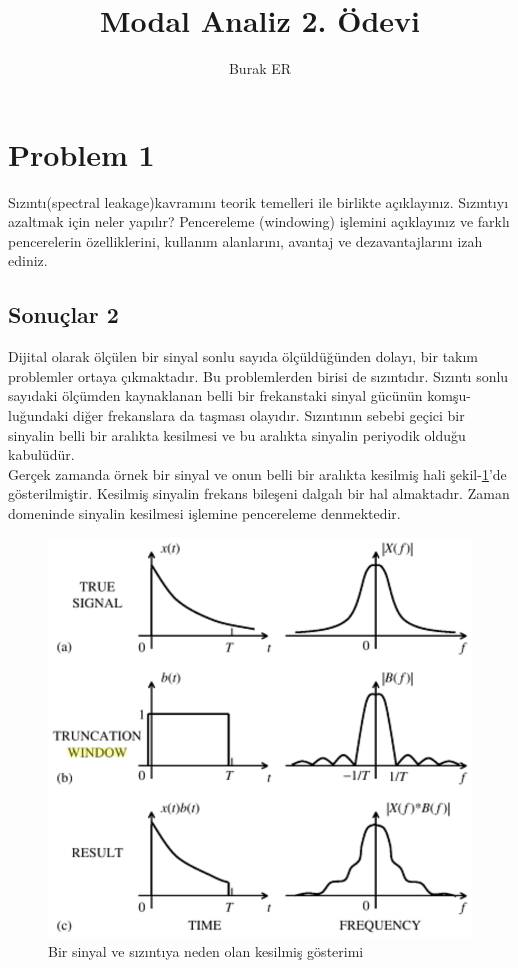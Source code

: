 \documentclass[turkish]{report}
\title{Modal Analiz 2. Ödevi}
\author{Burak ER}
\begin{document}
\maketitle
\section*{Problem 1}
Sızıntı(spectral  leakage)kavramını teorik temelleri ile birlikte  açıklayınız. Sızıntıyı azaltmak için neler yapılır? Pencereleme  (windowing) işlemini açıklayınız ve farklı pencerelerin özelliklerini, kullanım alanlarını, avantaj ve dezavantajlarını izah ediniz. 
\begin{center}
\subsection*{Sonuçlar 2}
\end{center}
Dijital olarak ölçülen bir sinyal sonlu sayıda ölçüldüğünden dolayı, bir takım problemler ortaya çıkmaktadır.
Bu problemlerden birisi de sızıntıdır. Sızıntı sonlu sayıdaki ölçümden kaynaklanan belli bir frekanstaki sinyal gücünün komşu-
luğundaki diğer frekanslara da taşması olayıdır. Sızıntının sebebi geçici bir sinyalin belli bir aralıkta kesilmesi ve bu aralıkta sinyalin periyodik olduğu kabulüdür.\\

Gerçek zamanda örnek bir sinyal ve onun belli bir aralıkta kesilmiş hali şekil-\ref{fig:leakage}'de gösterilmiştir. Kesilmiş sinyalin frekans bileşeni dalgalı bir hal almaktadır.
Zaman domeninde sinyalin kesilmesi işlemine pencereleme denmektedir.
\begin{figure}[ht!]
\centering
\includegraphics{./Figures/leakeage.eps}
\caption{Bir sinyal ve sızıntıya neden olan kesilmiş gösterimi\cite{norton2003fundamentals}}
\label{fig:leakage}
\end{figure}
\end{document}
